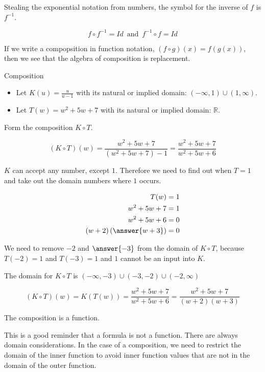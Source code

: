 \documentclass{ximera}
\begin{document}
Stealing the exponential notation from numbers, the symbol for the inverse of $f$ is $f^{-1}$.

\[   f \circ f^{-1} = Id    \, \text{ and } \, f^{-1} \circ f = Id       \]




If we write a compopsition in function notation, $(f \circ g)(x) = f(g(x))$, then we see that the algebra of composition is replacement.





\begin{example} Composition


\begin{itemize}
\item Let $K(u) = \frac{u}{u-1}$ with its natural or implied domain: $(-\infty, 1) \cup (1, \infty)$. 

\item Let $T(w) = w^2 + 5w + 7$ with its natural or implied domain: \textbf{$\mathbb{R}$}.
\end{itemize}


Form the composition $K \circ T$.

\[        (K \circ T)(w) =     \frac{w^2 + 5w + 7}{(w^2 + 5w + 7)-1}   =    \frac{w^2 + 5w + 7}{w^2 + 5w + 6}  \]


$K$ can accept any number, except $1$.  Therefore we need to find out when $T = 1$ and take out the domain numbers where $1$ occurs.



\begin{align*}
T(w) & = 1   \\
w^2 + 5w + 7 & = 1 \\
w^2 + 5w + 6 & = 0   \\
(w+2)\left( \answer{w+3} \right) & = 0
\end{align*}


We need to remove $-2$ and $\answer{-3}$ from the domain of $K \circ T$, because $T(-2)=1$ and $T(-3)=1$ and $1$ cannot be an input into $K$.


The domain for $K \circ T$ is $(-\infty, -3) \cup (-3, -2) \cup (-2, \infty)$




\[        (K \circ T)(w)  =  K(T(w))  = \frac{w^2 + 5w + 7}{w^2 + 5w + 6}  =    \frac{w^2 + 5w + 7}{(w+2)(w+3)} \]










The composition is a function. 


This is a good reminder that a formula is not a function. There are always domain considerations.  In the case of a composition, we need to restrict the domain of the inner function to avoid inner function values that are not in the domain of the outer function.










\end{example}
\end{document}

